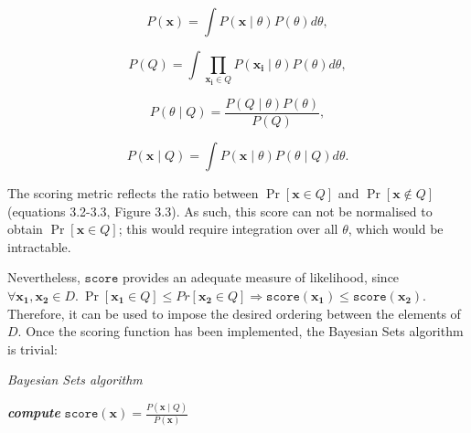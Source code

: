 \documentclass[12pt,twoside,notitlepage,amsart]{report} %
\begin{document}
	\begin{equation} \displaystyle P(\mathbf{x}) = \int{P(\mathbf{x} \mid \theta) P(\theta) d\theta}, \end{equation}
	
	\begin{equation*} \displaystyle P(Q) = \int{ \prod_{\mathbf{x_i} \in Q} P(\mathbf{x_i} \mid \theta) P(\theta) d\theta }, \end{equation*}
	
	\begin{equation*} \displaystyle P(\theta \mid Q) = \frac{P(Q\mid\theta)P(\theta)}{P(Q)}, \end{equation*}
	   
	\begin{equation} \displaystyle P(\mathbf{x} \mid Q) = \int{P(\mathbf{x} \mid \theta) P( \theta \mid Q ) d\theta}.   \end{equation}
	
	The scoring metric reflects the ratio between $\Pr[\mathbf{x} \in Q]$ and $\Pr[ \mathbf{x}\notin Q ]$ (equations 3.2-3.3, Figure 3.3). As such, this score can not be normalised to obtain $\Pr[\mathbf{x} \in Q]$; this would require integration over all $\theta$, which would be intractable. 
	
	Nevertheless, $\texttt{score}$ provides an adequate measure of likelihood, since $\forall \mathbf{x_1}, \mathbf{x_2} \in D. ~ \Pr[\mathbf{x_1} \in Q] \leq Pr[\mathbf{x_2} \in Q] \Rightarrow \texttt{score}(\mathbf{x_1}) \leq \texttt{score}(\mathbf{x_2})$. Therefore, it can be used to impose the desired ordering between the elements of $D$. Once the scoring function has been implemented, the Bayesian Sets algorithm is trivial: 
	
	\renewcommand{\thealgorithm}{3.1}
	
	\begin{algorithm}
	  \caption{\emph{Bayesian Sets algorithm} 
	    \label{alg:bayesiansets}}
	  \begin{algorithmic}[1]
	    \Statex
	        \Statex
	        \State \emph{\textbf{compute}} $ \displaystyle \texttt{score}(\mathbf{x}) =  \frac{ P(\mathbf{x} \mid Q) }{ P(\mathbf{x}) } $ 
					\EndFor
					\Statex
	      
	  \end{algorithmic}
	\end{algorithm}
	
\end{document}
